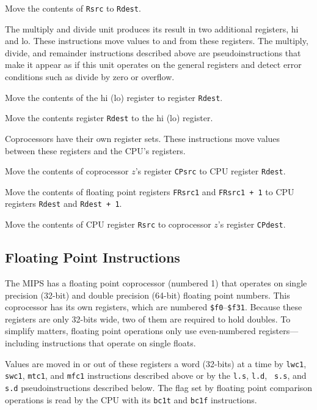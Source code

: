 Move the contents of {\tt Rsrc} to {\tt Rdest}.

\bigskip

The multiply and divide unit produces its result in two additional
registers, hi and lo.  These instructions move values to and from
these registers.  The multiply, divide, and remainder instructions
described above are pseudoinstructions that make it appear as if this
unit operates on the general registers and detect error conditions
such as divide by zero or overflow.

Move the contents of the hi (lo) register to register {\tt Rdest}.

Move the contents register {\tt Rdest} to the hi (lo) register.

\bigskip

Coprocessors have their own register sets.  These instructions move
values between these registers and the CPU's registers.

Move the contents of coprocessor $z$'s register {\tt CPsrc} to CPU
register {\tt Rdest}.

Move the contents of floating point registers {\tt FRsrc1} and
{\tt FRsrc1 + 1} to CPU registers {\tt Rdest} and {\tt Rdest + 1}.

Move the contents of CPU register {\tt Rsrc} to coprocessor $z$'s
register {\tt CPdest}.


\subsection{Floating Point Instructions}

The MIPS has a floating point coprocessor (numbered 1) that operates
on single precision (32-bit) and double precision (64-bit) floating
point numbers.  This coprocessor has its own registers, which are
numbered {\tt \$f0}--{\tt \$f31}.  Because these registers are only
32-bits wide, two of them are required to hold doubles. To simplify
matters, floating point operations only use even-numbered
registers---including instructions that operate on single floats.

Values are moved in or out of these registers a word (32-bits) at a
time by {\tt lwc1}, {\tt swc1}, {\tt mtc1}, and {\tt mfc1}
instructions described above or by the {\tt l.s}, {\tt l.d}, {\tt
s.s}, and {\tt s.d} pseudoinstructions described below.  The flag set
by floating point comparison operations is read by the CPU with its
{\tt bc1t} and {\tt bc1f} instructions.

